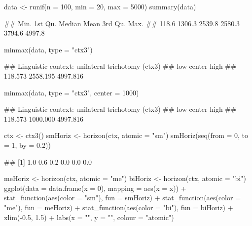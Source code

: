 \documentclass{article}\usepackage[]{graphicx}\usepackage[]{color}
\begin{document}
\begin{Schunk}
% --begin: "minmax"
\begin{Sinput}
data <- runif(n = 100, min = 20, max = 5000)
summary(data)
\end{Sinput}
\begin{Soutput}
##    Min. 1st Qu.  Median    Mean 3rd Qu.    Max. 
##   118.6  1306.3  2539.8  2580.3  3794.6  4997.8
\end{Soutput}
\begin{Sinput}
minmax(data, type = "ctx3")
\end{Sinput}
\begin{Soutput}
## Linguistic context: unilateral trichotomy (ctx3)
##      low   center     high 
##  118.573 2558.195 4997.816
\end{Soutput}
%
% --end: "minmax"
\end{Schunk}

\begin{Schunk}
% --begin: "minmax2"
\begin{Sinput}
minmax(data, type = "ctx3", center = 1000)
\end{Sinput}
\begin{Soutput}
## Linguistic context: unilateral trichotomy (ctx3)
##      low   center     high 
##  118.573 1000.000 4997.816
\end{Soutput}
%
% --end: "minmax2"
\end{Schunk}

\begin{Schunk}
% --begin: "horizon"
\begin{Sinput}
ctx <- ctx3()
smHoriz <- horizon(ctx, atomic = "sm")
smHoriz(seq(from = 0, to = 1, by = 0.2))
\end{Sinput}
\begin{Soutput}
## [1] 1.0 0.6 0.2 0.0 0.0 0.0
\end{Soutput}
%
% --end: "horizon"
\end{Schunk}

\begin{Schunk}
\begin{Sinput}
meHoriz <- horizon(ctx, atomic = "me")
biHoriz <- horizon(ctx, atomic = "bi")
ggplot(data = data.frame(x = 0), mapping = aes(x = x)) + stat_function(aes(color = "sm"), 
    fun = smHoriz) + stat_function(aes(color = "me"), fun = meHoriz) + 
    stat_function(aes(color = "bi"), fun = biHoriz) + xlim(-0.5, 1.5) + 
    labs(x = "", y = "", colour = "atomic\nexpression")
\end{Sinput}
\end{Schunk}
\end{document}
